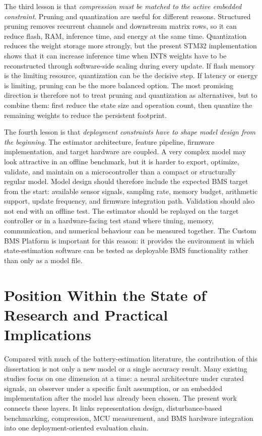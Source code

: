\documentclass[
    a4paper,
    12pt,
    titlepage,
    bibliography=totoc,
    twoside=on,
    parskip=false,
    numbers=noenddot,
    cleardoublepage=empty,
    DIV=12,
    BCOR=12.0mm,
    headheight=36pt,
    headings=openright
]{scrreprt}
\begin{document}
The third lesson is that \emph{compression must be matched to the active embedded constraint}. Pruning and quantization are useful for different reasons. Structured pruning removes recurrent channels and downstream matrix rows, so it can reduce flash, RAM, inference time, and energy at the same time. Quantization reduces the weight storage more strongly, but the present STM32 implementation shows that it can increase inference time when INT8 weights have to be reconstructed through software-side scaling during every update. If flash memory is the limiting resource, quantization can be the decisive step. If latency or energy is limiting, pruning can be the more balanced option. The most promising direction is therefore not to treat pruning and quantization as alternatives, but to combine them: first reduce the state size and operation count, then quantize the remaining weights to reduce the persistent footprint.

The fourth lesson is that \emph{deployment constraints have to shape model design from the beginning}. The estimator architecture, feature pipeline, firmware implementation, and target hardware are coupled. A very complex model may look attractive in an offline benchmark, but it is harder to export, optimize, validate, and maintain on a microcontroller than a compact or structurally regular model. Model design should therefore include the expected BMS target from the start: available sensor signals, sampling rate, memory budget, arithmetic support, update frequency, and firmware integration path. Validation should also not end with an offline test. The estimator should be replayed on the target controller or in a hardware-facing test stand where timing, memory, communication, and numerical behaviour can be measured together. The Custom BMS Platform is important for this reason: it provides the environment in which state-estimation software can be tested as deployable BMS functionality rather than only as a model file.

\section{Position Within the State of Research and Practical Implications}
Compared with much of the battery-estimation literature, the contribution of this dissertation is not only a new model or a single accuracy result. Many existing studies focus on one dimension at a time: a neural architecture under curated signals, an observer under a specific fault assumption, or an embedded implementation after the model has already been chosen. The present work connects these layers. It links representation design, disturbance-based benchmarking, compression, MCU measurement, and BMS hardware integration into one deployment-oriented evaluation chain.
\end{document}
